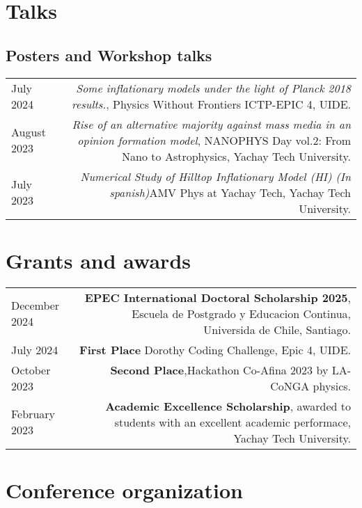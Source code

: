 \documentclass{article}
\begin{document}
\section*{Talks}
\subsection*{Posters and Workshop talks}
\begin{tabular}{L!{\vrule}R}

    July 2024 & \textit{Some inflationary models under the light of Planck 2018 results.}, Physics Without Frontiers ICTP-EPIC 4, UIDE. \\

    August 2023 & \textit{Rise of an alternative majority against mass media in an opinion formation model}, NANOPHYS Day vol.2: From Nano to Astrophysics, Yachay Tech University. \\

    July 2023 & \textit{Numerical Study of Hilltop Inflationary Model (HI) (In spanish)}AMV Phys at Yachay Tech, Yachay Tech University. \\

    

\end{tabular}


\section*{Grants and awards}

\begin{tabular}{L!{\vrule}R}
    December 2024 & \textbf{EPEC International Doctoral Scholarship 2025}, Escuela de Postgrado y Educacion Continua, Universida de Chile, Santiago.\\
    July 2024 & \textbf{First Place} Dorothy Coding Challenge, Epic 4, UIDE. \\
    October 2023 & \textbf{Second Place},Hackathon Co-Afina 2023 by LA-CoNGA physics. \\
    February 2023 & \textbf{Academic Excellence Scholarship}, awarded to students with an excellent academic performace, Yachay Tech University. \\
    
\end{tabular}


\section*{Conference organization}
\end{document}
